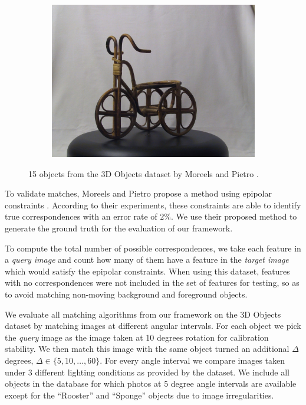\documentclass[runningheads]{llncs}
\begin{document}
\begin{figure}[htb]
\begin{subfigure}[t]{0.15\columnwidth}
        \includegraphics[width=1\columnwidth]{images/3d/15}
    \end{subfigure}%
    \vspace{1.5 mm}

    \caption{15 objects from the 3D Objects dataset by Moreels
    and Pietro \cite{moreels2007evaluation}.}
    \label{fig:3d_objects}
\end{figure}

To validate matches, Moreels and Pietro propose a method using epipolar constraints \cite[p.266]{moreels2007evaluation}.  According to their experiments, these constraints are able to identify true correspondences with an error rate of $2\%$. We use their proposed method to generate the ground truth for the evaluation of our framework.

To compute the total number of possible correspondences, we take each feature in a \emph{query image} and count how many of them have a feature in the \emph{target image} which would satisfy the epipolar constraints. When using this dataset, features with no correspondences were not included in the set of features for testing, so as to avoid matching non-moving background and foreground objects.

We evaluate all matching algorithms from our framework on the 3D Objects dataset by matching images at different angular intervals. For each object we pick the \emph{query} image as the image taken at 10 degrees rotation for calibration stability.  We then match this image with the same object turned an additional $\Delta$ degrees, $\Delta \in \{5, 10, \ldots, 60\}$.  For every angle interval we compare images taken under 3 different lighting conditions as provided by the dataset. We include all objects in the database for which photos at 5 degree angle intervals are available except for the ``Rooster'' and ``Sponge'' objects due to image irregularities.
\end{document}
